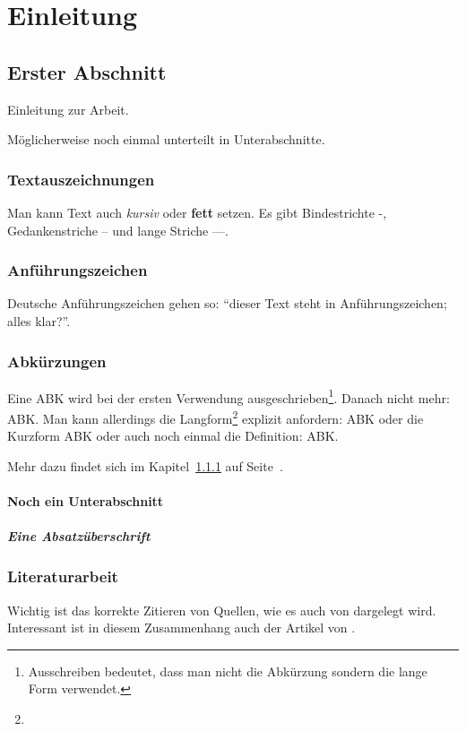 \chapter{Einleitung}

\section{Erster Abschnitt}

Einleitung zur Arbeit.

Möglicherweise noch einmal unterteilt in Unterabschnitte.

\subsection{Textauszeichnungen}
\label{Einleitung:Textauszeichnungen}

Man kann Text auch \textit{kursiv} oder \textbf{fett} setzen. Es gibt Bindestrichte -, Gedankenstriche -- und lange Striche ---.


\subsection{Anführungszeichen}

Deutsche Anführungszeichen gehen so: "`dieser Text steht in \glq Anführungszeichen\grq; alles klar?"'.


\subsection{Abkürzungen}

Eine \ac{ABK} wird bei der ersten Verwendung ausgeschrieben\footnote{Ausschreiben bedeutet, dass man nicht die Abkürzung sondern die lange Form verwendet.}. Danach nicht mehr: \ac{ABK}. Man kann allerdings die Langform\footnote{\blindtext} explizit anfordern: \acl{ABK} oder die Kurzform \acs{ABK} oder auch noch einmal die Definition: \acf{ABK}.

Mehr dazu findet sich im Kapitel~\ref{Einleitung:Textauszeichnungen} auf Seite~\pageref{Einleitung:Textauszeichnungen}.


\subsubsection{Noch ein Unterabschnitt}

\paragraph{Eine Absatzüberschrift}
\blindtext[1]


\subsection{Literaturarbeit}

Wichtig ist das korrekte Zitieren von Quellen, wie es auch von \cite{Kornmeier2011} dargelegt wird. Interessant ist in diesem Zusammenhang auch der Artikel von \cite{Vixie2007}.

\blindtext[4]